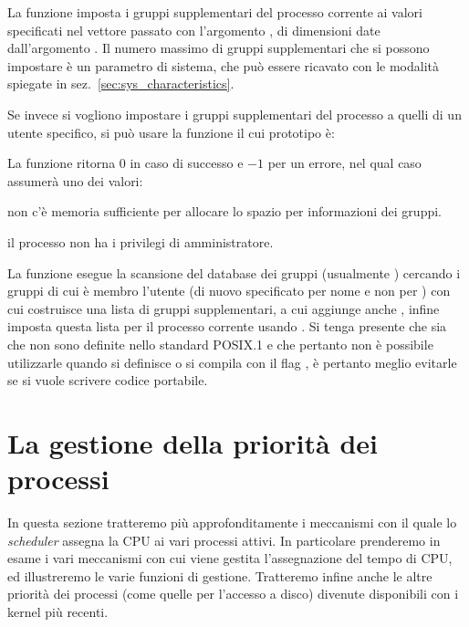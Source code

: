 La funzione imposta i gruppi supplementari del processo corrente ai valori
specificati nel vettore passato con l'argomento , di dimensioni
date dall'argomento . Il numero massimo di gruppi supplementari
che si possono impostare è un parametro di sistema, che può essere ricavato
con le modalità spiegate in sez.~\ref{sec:sys_characteristics}.

Se invece si vogliono impostare i gruppi supplementari del processo a quelli
di un utente specifico, si può usare la funzione  il cui
prototipo è:

\begin{funcproto}{ 
}
{La funzione ritorna $0$ in caso di successo e $-1$ per un errore, nel qual
caso  assumerà uno dei valori:
\begin{errlist}
\item[\errcode{ENOMEM}] non c'è memoria sufficiente per allocare lo spazio per
  informazioni dei gruppi.
\item[\errcode{EPERM}] il processo non ha i privilegi di amministratore.
\end{errlist}}
\end{funcproto}

La funzione esegue la scansione del database dei gruppi (usualmente
) cercando i gruppi di cui è membro l'utente 
(di nuovo specificato per nome e non per ) con cui costruisce una
lista di gruppi supplementari, a cui aggiunge anche , infine
imposta questa lista per il processo corrente usando .  Si
tenga presente che sia  che  non sono
definite nello standard POSIX.1 e che pertanto non è possibile utilizzarle
quando si definisce  o si compila con il flag
, è pertanto meglio evitarle se si vuole scrivere codice portabile.

 
\section{La gestione della priorità dei processi}
\label{sec:proc_priority}

In questa sezione tratteremo più approfonditamente i meccanismi con il quale
lo \textit{scheduler} assegna la CPU ai vari processi attivi.  In particolare
prenderemo in esame i vari meccanismi con cui viene gestita l'assegnazione del
tempo di CPU, ed illustreremo le varie funzioni di gestione. Tratteremo infine
anche le altre priorità dei processi (come quelle per l'accesso a disco)
divenute disponibili con i kernel più recenti.


